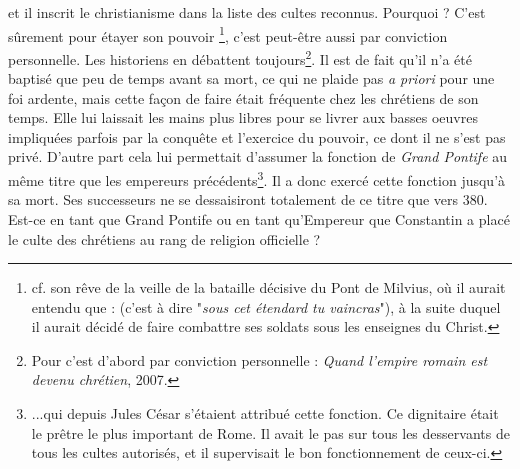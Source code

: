 et il inscrit le christianisme dans la liste des cultes reconnus. 
Pourquoi ? C'est sûrement pour étayer son pouvoir \footnote{cf. son rêve de la veille de la bataille décisive du Pont de Milvius, où il aurait entendu que :  (c'est à dire "\emph{sous cet étendard tu vaincras}"), à la suite duquel il aurait décidé de faire combattre ses soldats sous les enseignes du Christ.}, c'est peut-être aussi par conviction personnelle. Les historiens en débattent toujours\footnote{Pour  c'est d'abord par conviction personnelle : \emph{Quand l'empire romain est devenu chrétien}, 2007.}. Il est de fait qu'il n'a été baptisé que peu de temps avant sa mort, ce qui ne plaide pas \emph{a priori} pour une foi ardente, mais cette façon de faire était fréquente chez les chrétiens de son temps. Elle lui laissait les mains plus libres pour se livrer aux basses oeuvres impliquées parfois par la conquête et l'exercice du pouvoir, ce dont il ne s'est pas privé. D'autre part cela lui permettait d'assumer la fonction de \emph{Grand Pontife} au même titre que les empereurs précédents\footnote{...qui depuis Jules César s'étaient attribué cette fonction. Ce dignitaire était le prêtre le plus important de Rome. Il avait le pas sur tous les desservants de tous les cultes autorisés, et il supervisait le bon fonctionnement de ceux-ci.}. Il a donc exercé cette fonction jusqu'à sa mort. Ses successeurs ne se dessaisiront totalement de ce titre que vers 380. Est-ce en tant que Grand Pontife ou en tant qu'Empereur que Constantin a placé le culte des chrétiens au rang de religion officielle ? 

